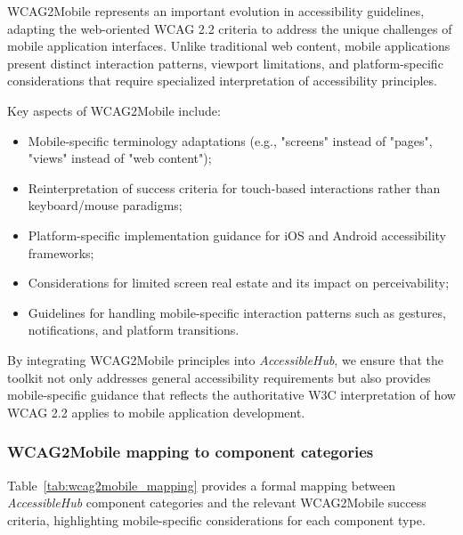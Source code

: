 WCAG2Mobile represents an important evolution in accessibility guidelines, adapting the web-oriented WCAG 2.2 criteria to address the unique challenges of mobile application interfaces. Unlike traditional web content, mobile applications present distinct interaction patterns, viewport limitations, and platform-specific considerations that require specialized interpretation of accessibility principles.

Key aspects of WCAG2Mobile include:

\begin{itemize}
    \item Mobile-specific terminology adaptations (e.g., "screens" instead of "pages", "views" instead of "web content");
    
    \item Reinterpretation of success criteria for touch-based interactions rather than keyboard/mouse paradigms;
    
    \item Platform-specific implementation guidance for iOS and Android accessibility frameworks;
    
    \item Considerations for limited screen real estate and its impact on perceivability;
    
    \item Guidelines for handling mobile-specific interaction patterns such as gestures, notifications, and platform transitions.
\end{itemize}

By integrating WCAG2Mobile principles into \textit{AccessibleHub}, we ensure that the toolkit not only addresses general accessibility requirements but also provides mobile-specific guidance that reflects the authoritative W3C interpretation of how WCAG 2.2 applies to mobile application development.

\subsubsection{WCAG2Mobile mapping to component categories}

Table~\ref{tab:wcag2mobile_mapping} provides a formal mapping between \textit{AccessibleHub} component categories and the relevant WCAG2Mobile success criteria, highlighting mobile-specific considerations for each component type.

